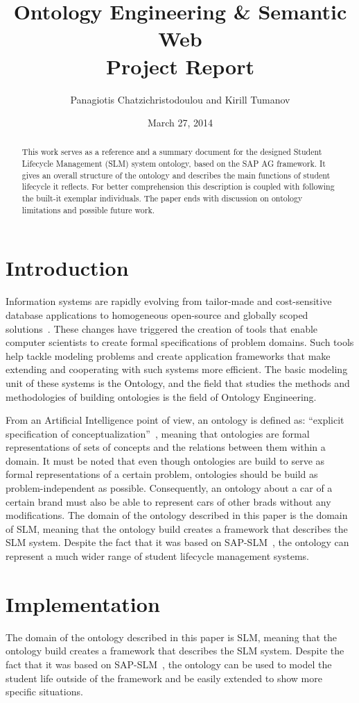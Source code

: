 \documentclass{article}    %
\title{Ontology Engineering \& Semantic Web \\ Project Report}  %
\author{Panagiotis Chatzichristodoulou and Kirill Tumanov}    %
\date{March 27, 2014}   %
\begin{document}
%
\maketitle                 %
%
\begin{abstract}
%
This work serves as a reference and a summary document for the designed Student Lifecycle Management (SLM) system ontology, based on the SAP AG framework. It gives an overall structure of the ontology and describes the main functions of student lifecycle it reflects. For better comprehension this description is coupled with following the built-it exemplar individuals. The paper ends with discussion on ontology limitations and possible future work.
%
\end{abstract}
%
% 
\section{Introduction}
%
Information systems are rapidly evolving from tailor-made and cost-sensitive database applications to homogeneous open-source and globally scoped solutions~\cite{Semantic Web Primer}. These changes have triggered the creation of tools that enable computer scientists to create formal specifications of problem domains. Such tools help tackle modeling problems and create application frameworks that make extending and cooperating with such systems more efficient. The basic modeling unit of these systems is the Ontology, and the field that studies the methods and methodologies of building ontologies is the field of Ontology Engineering.

 From an Artificial Intelligence point of view, an ontology is defined as: ``explicit specification of conceptualization''~\cite{Gruber}, meaning that ontologies are formal representations of sets of concepts and the relations between them within a domain. It must be noted that even though ontologies are build to serve as formal representations of a certain problem, ontologies should be build as problem-independent as possible. Consequently, an ontology about a car of a certain brand must also be able to represent cars of other brads without any modifications. The domain of the ontology described in this paper is the domain of SLM, meaning that the ontology build creates a framework that describes the SLM system. Despite the fact that it was based on SAP-SLM~\cite{sap}, the ontology can represent a much wider range of student lifecycle management systems.
% 
\section{Implementation}
%
The domain of the ontology described in this paper is SLM, meaning that the ontology build creates a framework that describes the SLM system. Despite the fact that it was based on SAP-SLM~\cite{sap}, the ontology can be used to model the student life outside of the framework and be easily extended to show more specific situations.
\end{document}

